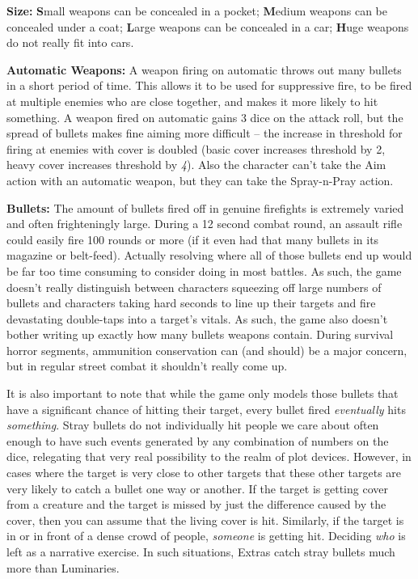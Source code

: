 \textbf{Size:} \textbf{S}mall weapons can be concealed in a pocket; \textbf{M}edium weapons can be concealed under a coat; \textbf{L}arge weapons can be concealed in a car; \textbf{H}uge weapons do not really fit into cars.

\textbf{Automatic Weapons:} A weapon firing on automatic throws out many bullets in a short period of time. This allows it to be used for suppressive fire, to be fired at multiple enemies who are close together, and makes it more likely to hit something. A weapon fired on automatic gains 3 dice on the attack roll, but the spread of bullets makes fine aiming more difficult -- the increase in threshold for firing at enemies with cover is doubled (basic cover increases threshold by 2, heavy cover increases threshold by \textit{4}). Also the character can't take the Aim action with an automatic weapon, but they can take the Spray-n-Pray action.

\textbf{Bullets:} The amount of bullets fired off in genuine firefights is extremely varied and often frighteningly large. During a 12 second combat round, an assault rifle could easily fire 100 rounds or more (if it even had that many bullets in its magazine or belt-feed). Actually resolving where all of those bullets end up would be far too time consuming to consider doing in most battles. As such, the game doesn't really distinguish between characters squeezing off large numbers of bullets and characters taking hard seconds to line up their targets and fire devastating double-taps into a target's vitals. As such, the game also doesn't bother writing up exactly how many bullets weapons contain. During survival horror segments, ammunition conservation can (and should) be a major concern, but in regular street combat it shouldn't really come up. 

It is also important to note that while the game only models those bullets that have a significant chance of hitting their target, every bullet fired \textit{eventually} hits \textit{something}. Stray bullets do not individually hit people we care about often enough to have such events generated by any combination of numbers on the dice, relegating that very real possibility to the realm of plot devices. However, in cases where the target is very close to other targets that these other targets are very likely to catch a bullet one way or another. If the target is getting cover from a creature and the target is missed by just the difference caused by the cover, then you can assume that the living cover is hit. Similarly, if the target is in or in front of a dense crowd of people, \textit{someone} is getting hit. Deciding \textit{who} is left as a narrative exercise. In such situations, Extras catch stray bullets much more than Luminaries.

